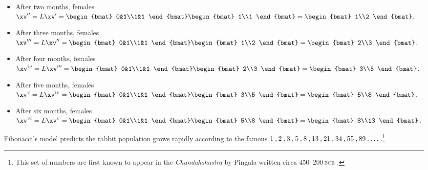 \begin{example}
\begin{itemize}
\item After two months,  females \(\xv''=L\xv'=\begin{bmat} 0&1\\1&1 \end{bmat}\begin{bmat} 1\\1 \end{bmat}=\begin{bmat} 1\\2 \end{bmat}\).
\item After three months,  females \(\xv'''=L\xv''=\begin{bmat} 0&1\\1&1 \end{bmat}\begin{bmat} 1\\2 \end{bmat}=\begin{bmat} 2\\3 \end{bmat}\).
\item After four months,  females \(\xv^{iv}=L\xv'''=\begin{bmat} 0&1\\1&1 \end{bmat}\begin{bmat} 2\\3 \end{bmat}=\begin{bmat} 3\\5 \end{bmat}\).
\item After five months,  females \(\xv^{v}=L\xv^{iv}=\begin{bmat} 0&1\\1&1 \end{bmat}\begin{bmat} 3\\5 \end{bmat}=\begin{bmat} 5\\8 \end{bmat}\).
\item After six months,  females \(\xv^{vi}=L\xv^{v}=\begin{bmat} 0&1\\1&1 \end{bmat}\begin{bmat} 5\\8 \end{bmat}=\begin{bmat} 8\\13 \end{bmat}\).
\end{itemize}
Fibonacci's model predicts the rabbit population grows rapidly according to the famous  \(\mathcode`\,="213B 1,2,3,5,8,13,21,34,55,89,\ldots\)\,.\footnote{This set of numbers are first known to appear in the \emph{Chandahshastra} by Pingala written circa 450--200\,\textsc{bce} \cite[]{Devlin2011}.}
\end{example}




